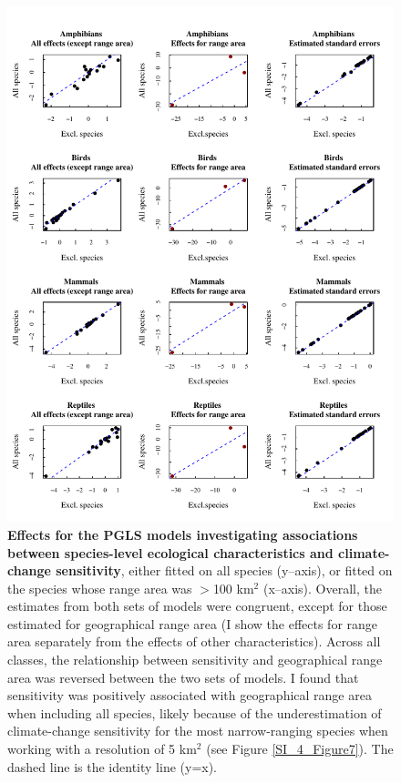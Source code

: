 \begin{figure}[h!]
\centering
\includegraphics[scale=0.85, trim={0 0 5.5cm 0}, clip]{Supporting/Chapter4/Figures/ClimateChangeModelsEstimates.pdf}
\caption[Effects for the PGLS models investigating associations between species-level ecological characteristics and climate-change sensitivity, either fitted on all species (y--axis), or fitted on the species whose range area was $>$100 km$^2$ (x--axis)]{\textbf{Effects for the PGLS models investigating associations between species-level ecological characteristics and climate-change sensitivity}, either fitted on all species (y--axis), or fitted on the species whose range area was $>$100 km$^2$ (x--axis). Overall, the estimates from both sets of models were congruent, except for those estimated for geographical range area (I show the effects for range area separately from the effects of other characteristics). Across all classes, the relationship between sensitivity and geographical range area was reversed between the two sets of models. I found that sensitivity was positively associated with geographical range area when including all species, likely because of the underestimation of climate-change sensitivity for the most narrow-ranging species when working with a resolution of 5 km$^2$ (see Figure \ref{SI_4_Figure7}). The dashed line is the identity line (y=x).}
\label{SI_4_Figure22}
\end{figure}

